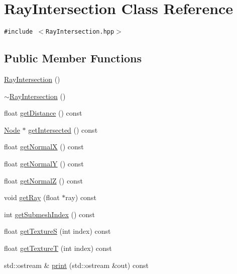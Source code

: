 \hypertarget{classm3g_1_1RayIntersection}{
\section{RayIntersection Class Reference}
\label{classm3g_1_1RayIntersection}
}
{\tt \#include $<$RayIntersection.hpp$>$}

\subsection*{Public Member Functions}
\begin{CompactItemize}
\item 
\hyperlink{classm3g_1_1RayIntersection_242b33a79f98ed90ad5a36912d2a46d5}{RayIntersection} ()
\item 
\hyperlink{classm3g_1_1RayIntersection_bf9eb45cc9ff31acd542bb0da1b46fe1}{$\sim$RayIntersection} ()
\item 
float \hyperlink{classm3g_1_1RayIntersection_f024301f51d2ef67cac50e3255a49612}{getDistance} () const 
\item 
\hyperlink{classm3g_1_1Node}{Node} $\ast$ \hyperlink{classm3g_1_1RayIntersection_cbf90cea6001c33cc03b5a737b312f62}{getIntersected} () const 
\item 
float \hyperlink{classm3g_1_1RayIntersection_0ee7a8fab5e001b131bd3109da8af7fa}{getNormalX} () const 
\item 
float \hyperlink{classm3g_1_1RayIntersection_1e05e3b3e8d6b46462812e4713a63d18}{getNormalY} () const 
\item 
float \hyperlink{classm3g_1_1RayIntersection_5d0569741397401f53b776f16d08f5c3}{getNormalZ} () const 
\item 
void \hyperlink{classm3g_1_1RayIntersection_3f4d1f2f24c0dadab914014836e1b138}{getRay} (float $\ast$ray) const 
\item 
int \hyperlink{classm3g_1_1RayIntersection_6a11c61d1a1fecc01f2f83463404a6b8}{getSubmeshIndex} () const 
\item 
float \hyperlink{classm3g_1_1RayIntersection_bc14e1d5a83d5fca608b1fbf772614d4}{getTextureS} (int index) const 
\item 
float \hyperlink{classm3g_1_1RayIntersection_843d5b907bb54a6f28571f0a0f14c932}{getTextureT} (int index) const 
\item 
std::ostream \& \hyperlink{classm3g_1_1RayIntersection_d6bd96bbcbdd53ede8e72f8f13c0da48}{print} (std::ostream \&out) const 
\end{CompactItemize}


